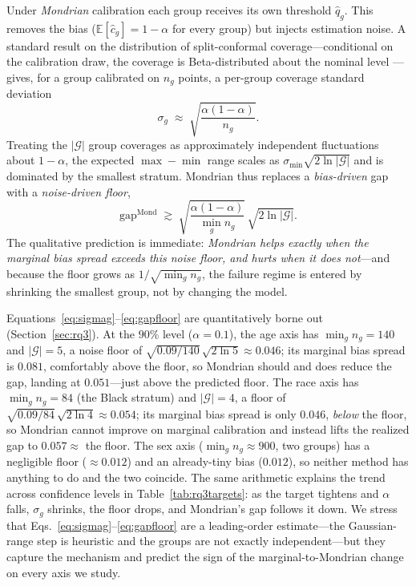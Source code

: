 \documentclass[review,12pt]{elsarticle}
\begin{document}
Under \emph{Mondrian} calibration each group receives its own threshold $\hat q_g$. This removes the bias ($\mathbb{E}[\hat c_g] = 1-\alpha$ for every group) but injects estimation noise. A standard result on the distribution of split-conformal coverage---conditional on the calibration draw, the coverage is Beta-distributed about the nominal level \cite{angelopoulos2023}---gives, for a group calibrated on $n_g$ points, a per-group coverage standard deviation
\begin{equation}
\sigma_g \;\approx\; \sqrt{\frac{\alpha(1-\alpha)}{n_g}} .
\label{eq:sigmag}
\end{equation}
Treating the $|\mathcal{G}|$ group coverages as approximately independent fluctuations about $1-\alpha$, the expected $\max-\min$ range scales as $\sigma_{\min}\sqrt{2\ln|\mathcal{G}|}$ and is dominated by the smallest stratum. Mondrian thus replaces a \emph{bias-driven} gap with a \emph{noise-driven floor},
\begin{equation}
\mathrm{gap}^{\mathrm{Mond}} \;\gtrsim\; \sqrt{\frac{\alpha(1-\alpha)}{\min_g n_g}}\,\sqrt{2\ln|\mathcal{G}|}.
\label{eq:gapfloor}
\end{equation}
The qualitative prediction is immediate: \emph{Mondrian helps exactly when the marginal bias spread exceeds this noise floor, and hurts when it does not}---and because the floor grows as $1/\sqrt{\min_g n_g}$, the failure regime is entered by shrinking the smallest group, not by changing the model.

Equations~\eqref{eq:sigmag}--\eqref{eq:gapfloor} are quantitatively borne out (Section~\ref{sec:rq3}). At the $90\%$ level ($\alpha=0.1$), the age axis has $\min_g n_g = 140$ and $|\mathcal{G}|=5$, a noise floor of $\sqrt{0.09/140}\,\sqrt{2\ln 5}\approx 0.046$; its marginal bias spread is $0.081$, comfortably above the floor, so Mondrian should and does reduce the gap, landing at $0.051$---just above the predicted floor. The race axis has $\min_g n_g = 84$ (the Black stratum) and $|\mathcal{G}|=4$, a floor of $\sqrt{0.09/84}\,\sqrt{2\ln 4}\approx 0.054$; its marginal bias spread is only $0.046$, \emph{below} the floor, so Mondrian cannot improve on marginal calibration and instead lifts the realized gap to $0.057\approx$ the floor. The sex axis ($\min_g n_g\approx 900$, two groups) has a negligible floor ($\approx 0.012$) and an already-tiny bias ($0.012$), so neither method has anything to do and the two coincide. The same arithmetic explains the trend across confidence levels in Table~\ref{tab:rq3targets}: as the target tightens and $\alpha$ falls, $\sigma_g$ shrinks, the floor drops, and Mondrian's gap follows it down. We stress that Eqs.~\eqref{eq:sigmag}--\eqref{eq:gapfloor} are a leading-order estimate---the Gaussian-range step is heuristic and the groups are not exactly independent---but they capture the mechanism and predict the sign of the marginal-to-Mondrian change on every axis we study.
\end{document}
